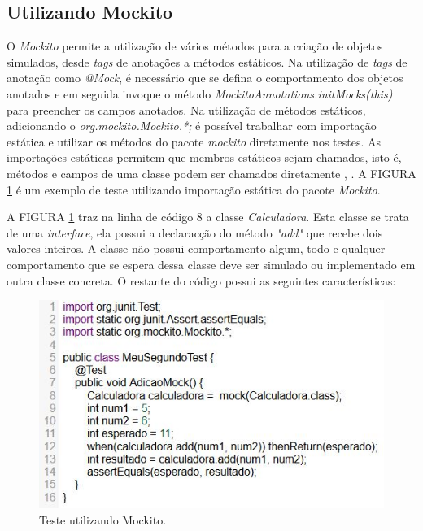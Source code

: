 \subsection{Utilizando Mockito}

O \textit{Mockito} permite a utilização de vários métodos para a criação de objetos simulados, desde \textit{tags} de anotações a métodos estáticos. 
Na utilização de \textit{tags} de anotação como \textit{@Mock}, é necessário que se defina o comportamento dos objetos anotados e em seguida invoque o método \textit{MockitoAnnotations.initMocks(this)} para preencher os campos anotados.
Na utilização de métodos estáticos, adicionando o \textit{org.mockito.Mockito.*;} é possível trabalhar com importação estática e utilizar os métodos do pacote \textit{mockito} diretamente nos testes. As importações estáticas permitem que membros estáticos sejam chamados, isto é, métodos e campos de uma classe podem ser chamados diretamente \cite{Mockito}, \cite{Javadoc}.
 A FIGURA \ref{mockito} é um exemplo de teste utilizando importação estática do pacote \textit{Mockito}.




A FIGURA \ref{mockito} traz na linha de código 8 a classe \textit{Calculadora}. Esta classe se trata de uma \textit{interface}, ela possui a declaracção do método \textit{"add"} que recebe dois valores inteiros. A classe não possui comportamento algum, todo e qualquer comportamento que se espera dessa classe deve ser simulado ou implementado em outra classe concreta. O restante do código possui as seguintes características:

\begin{figure}[H]
	\centering
	\includegraphics[scale=0.9]{dados/figuras/testeMock.JPG}
	\caption{Teste utilizando Mockito.}
	\label{mockito}
\end{figure}


